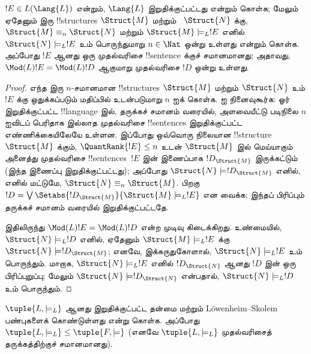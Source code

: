 \documentclass[../../../include/open-logic-section]{subfiles}
\begin{document}



\begin{lem}
$!E \in L(\Lang{L})$ என்றும், $\Lang{L}$ இறுதிக்குட்பட்டது என்றும்
கொள்க; மேலும் ஏதேனும் இரு !!{structure}s $\Struct{M}$ மற்றும்
~$\Struct{N}$ க்கு, $\Struct{M} \equiv_n \Struct{N}$ மற்றும்
$\Struct{M} \models_L !E$ எனில் $\Struct{N} \models_L !E$ உம்
பொருந்துமாறு $n \in \Nat$ ஒன்று உள்ளது என்றும் கொள்க. அப்போது
$!E$ ஆனது ஒரு முதல்வரிசை !!{sentence} க்குச் சமானமானது; அதாவது,
$\Mod(L){!E} = \Mod(L){!D}$ ஆகுமாறு முதல்வரிசை $!D$ ஒன்று உள்ளது.
\end{lem}

\begin{proof}
எந்த இரு $n$-சமானமான !!{structure}s $\Struct{M}$ மற்றும்
$\Struct{N}$ உம் $!E$ க்கு ஒதுக்கப்படும் மதிப்பில் உடன்படுமாறு
$n$ ஐக் கொள்க.  ஐ நினைவுகூர்க:
ஓர் இறுதிக்குட்பட்ட !!{language} இல், தருக்கச் சமானம் வரையில்,
அளவையீட்டு படிநிலை $n$ ஐவிடப் பெரிதாக இல்லாத முதல்வரிசை
!!{sentence}s இறுதிக்குட்பட்ட எண்ணிக்கையிலேயே உள்ளன. இப்போது
ஒவ்வொரு நிலையான !!{structure}~$\Struct{M}$ க்கும்,
$\QuantRank{!E} \le n$ உடன் $\Struct{M}$ இல் மெய்யாகும் அனைத்து
முதல்வரிசை !!{sentence}s~$!E$ இன் இணைப்பாக
$!D_{\Struct{M}}$ இருக்கட்டும் (இந்த இணைப்பு இறுதிக்குட்பட்டது);
அப்போது $\Struct{N} \models !D_{\Struct{M}}$ எனில், எனில் மட்டுமே,
$\Struct{N} \equiv_n \Struct{M}$. பிறகு $!D = \textstyle\bigvee
\Setabs{!D_{\Struct{M}}}{\Struct{M} \models_L !E}$ என வைக்க;
இந்தப் பிரிப்பும் தருக்கச் சமானம் வரையில் இறுதிக்குட்பட்டதே.

இதிலிருந்து $\Mod(L){!E} = \Mod(L){!D}$ என்ற முடிவு கிடைக்கிறது.
உண்மையில், $\Struct{N} \models_L !D$ எனில், ஏதேனும்
$\Struct{M} \models_L !E$ க்கு $\Struct{N} \models
!D_{\Struct{M}}$; எனவே, இக்கருதுகோளால், $\Struct{N} \models_L !E$
உம் பொருந்தும். மாறாக, $\Struct{N} \models_L !E$ எனில்
$!D_\Struct{N}$ ஆனது $!D$ இன் ஒரு பிரிப்புறுப்பு; மேலும்
$\Struct{N} \models !D_\Struct{N}$ என்பதால்,
$\Struct{N} \models_L !D$ உம் பொருந்தும்.
\end{proof}

\begin{thm}[Lindstr\"om தேற்றம்]
   $\tuple{L, \models_L}$ ஆனது
  இறுதிக்குட்பட்ட தன்மை மற்றும் L\"owenheim--Skolem பண்புகளைக்
  கொண்டுள்ளது என்று கொள்க. அப்போது $\tuple{L, \models_L} \le
  \tuple{F, \models}$ (எனவே $\tuple{L, \models_L}$ முதல்வரிசைத்
  தருக்கத்திற்குச் சமானமானது).
\end{thm}
\end{document}
